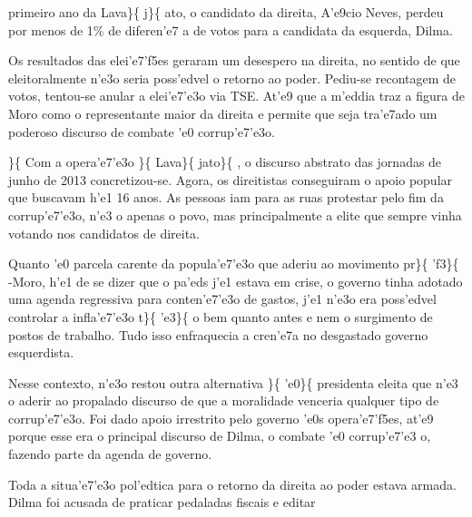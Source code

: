 primeiro ano da Lava\}\{\rtlch{}  \ltrch{} 
j\}\{\rtlch{}  \ltrch{}  ato,
o candidato da direita, A'e9cio Neves, perdeu por menos de 1\% de
diferen'e7 a de votos para a candidata da esquerda, Dilma. \par Os
resultados das elei'e7'f5es geraram um desespero na direita, no sentido
de que eleitoralmente n'e3o seria poss'edvel o retorno ao poder.
Pediu-se recontagem de votos, tentou-se anular a elei'e7'e3o via TSE.
At'e9 que a m'eddia traz a figura de Moro como o representante maior da
direita e permite que seja tra'e7ado um poderoso discurso de combate 'e0
corrup'e7'e3o. \par \}\{\rtlch{}  \ltrch{}  Com
a opera'e7'e3o \}\{\rtlch{}  \ltrch{} 
Lava\}\{\rtlch{}  \ltrch{} 
jato\}\{\rtlch{}  \ltrch{}  ,
o discurso abstrato das jornadas de junho de 2013 concretizou-se. Agora,
os direitistas conseguiram o apoio popular que buscavam h'e1 16 anos. As
pessoas iam para as ruas protestar pelo fim da corrup'e7'e3o, n'e3 o
apenas o povo, mas principalmente a elite que sempre vinha votando nos
candidatos de direita. \par Quanto 'e0 parcela carente da popula'e7'e3o
que aderiu ao movimento pr\}\{\rtlch{}  \ltrch{}
 'f3\}\{\rtlch{}  \ltrch{}
 -Moro, h'e1 de se dizer que o pa'eds
j'e1 estava em crise, o governo tinha adotado uma agenda regressiva para
conten'e7'e3o de gastos, j'e1 n'e3o era poss'edvel controlar a
infla'e7'e3o t\}\{\rtlch{}  \ltrch{} 
'e3\}\{\rtlch{}  \ltrch{}  o
bem quanto antes e nem o surgimento de postos de trabalho. Tudo isso
enfraquecia a cren'e7a no desgastado governo esquerdista. \par Nesse
contexto, n'e3o restou outra alternativa \}\{\rtlch{} 
\ltrch{}  'e0\}\{\rtlch{}  \ltrch{}
 presidenta eleita que n'e3 o aderir ao
propalado discurso de que a moralidade venceria qualquer tipo de
corrup'e7'e3o. Foi dado apoio irrestrito pelo governo 'e0s
opera'e7'f5es, at'e9 porque esse era o principal discurso de Dilma, o
combate 'e0 corrup'e7'e3 o, fazendo parte da agenda de governo.
\par Toda a situa'e7'e3o pol'edtica para o retorno da direita ao poder
estava armada. Dilma foi acusada de praticar pedaladas fiscais e editar
